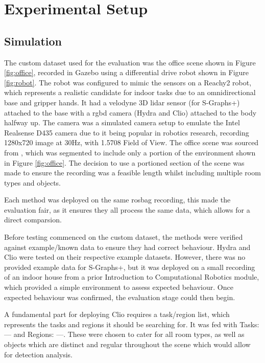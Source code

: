 
\section{Experimental Setup}\label{sec:design}

\subsection{Simulation}\label{sec:sim-setup}

The custom dataset used for the evaluation was the office scene shown in Figure \ref{fig:office}, recorded in Gazebo using a differential drive robot shown in Figure \ref{fig:robot}. The robot was configured to mimic the sensors on a Reachy2 \cite{Reachy2} robot, which represents a realistic candidate for indoor tasks due to an omnidirectional base and gripper hands. It had a velodyne 3D \acrshort{lidar} sensor (for S-Graphs+) attached to the base with a \acrshort{rgbd} camera (Hydra and Clio) attached to the body halfway up. The camera was a simulated camera setup to emulate the Intel Realsense D435 camera due to it being popular in robotics research, recording 1280x720 image at 30Hz, with 1.5708 Field of View. The office scene was sourced from \cite{gazebo-worlds-dataset}, which was segmented to include only a portion of the environment shown in Figure \ref{fig:office}. The decision to use a portioned section of the scene was made to ensure the recording was a feasible length whilst including multiple room types and objects.

Each method was deployed on the same rosbag recording, this made the evaluation fair, as it ensures they all process the same data, which allows for a direct comparsion.

Before testing commenced on the custom dataset, the methods were verified against example/known data to ensure they had correct behaviour. Hydra and Clio were tested on their respective example datasets. However, there was no provided example data for S-Graphs+, but it was deployed on a small recording of an indoor house from a prior Introduction to Computational Robotics module, which provided a simple environment to assess expected behaviour. Once expected behaviour was confirmed, the evaluation stage could then begin.

A fundamental part for deploying Clio requires a task/region list, which represents the tasks and regions it should be searching for. It was fed with Tasks: --- and Regions: ---. These were chosen to cater for all room types, as well as objects which are distinct and regular throughout the scene which would allow for detection analysis.

